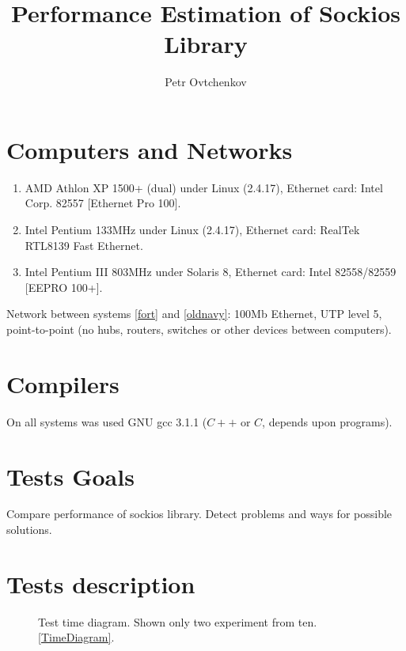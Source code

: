 \documentclass[a4paper]{article}
\title{Performance Estimation of Sockios Library}
\author{Petr Ovtchenkov}
\begin{document}
\maketitle

\section{Computers and Networks}

\begin{enumerate}
  \item AMD Athlon XP 1500+ (dual) under Linux (2.4.17),
        Ethernet card: Intel Corp. 82557 [Ethernet Pro 100].\label{fort}
  \item Intel Pentium 133MHz under Linux (2.4.17),
        Ethernet card: RealTek RTL8139 Fast Ethernet.\label{oldnavy}
  \item Intel Pentium III 803MHz under Solaris 8,
        Ethernet card: Intel 82558/82559 [EEPRO 100+].\label{ermine}
\end{enumerate}

Network between systems \ref{fort} and \ref{oldnavy}: 100Mb Ethernet,
UTP level 5, point-to-point (no hubs, routers,
switches or other devices between computers).

\section{Compilers}

On all systems was used GNU gcc 3{.}1{.}1 ($C{+}{+}$ or $C$, depends
upon programs).

\section{Tests Goals}

Compare performance of sockios library. Detect problems and ways for
possible solutions.

\section{Tests description}

\begin{figure}
  \begin{center}
  \end{center}
  \caption{Test time diagram. Shown only two experiment from ten.\ref{TimeDiagram}.}
\end{figure}
\end{document}
